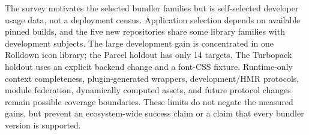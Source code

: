 The survey motivates the selected bundler families but is self-selected developer usage data, not a deployment census. Application selection depends on available pinned builds, and the five new repositories share some library families with development subjects. The large development gain is concentrated in one Rolldown icon library; the Parcel holdout has only 14 targets. The Turbopack holdout uses an explicit backend change and a font-CSS fixture. Runtime-only context completeness, plugin-generated wrappers, development/HMR protocols, module federation, dynamically computed assets, and future protocol changes remain possible coverage boundaries. These limits do not negate the measured gains, but prevent an ecosystem-wide success claim or a claim that every bundler version is supported.
